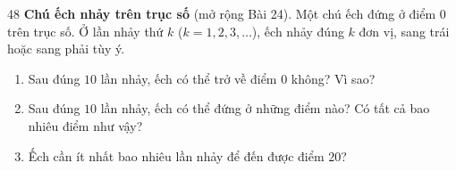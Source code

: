 \begin{probbox}{48}{}
\textbf{Chú ếch nhảy trên trục số} (mở rộng Bài 24). Một chú ếch đứng ở điểm $0$ trên trục số. Ở lần nhảy thứ $k$ ($k=1,2,3,\dots$), ếch nhảy đúng $k$ đơn vị, sang trái hoặc sang phải tùy ý.
\begin{enumerate}[label=\alph*),leftmargin=1.6em,itemsep=1pt]
\item Sau đúng $10$ lần nhảy, ếch có thể trở về điểm $0$ không? Vì sao?
\item Sau đúng $10$ lần nhảy, ếch có thể đứng ở những điểm nào? Có tất cả bao nhiêu điểm như vậy?
\item Ếch cần ít nhất bao nhiêu lần nhảy để đến được điểm $20$?
\end{enumerate}
\end{probbox}
